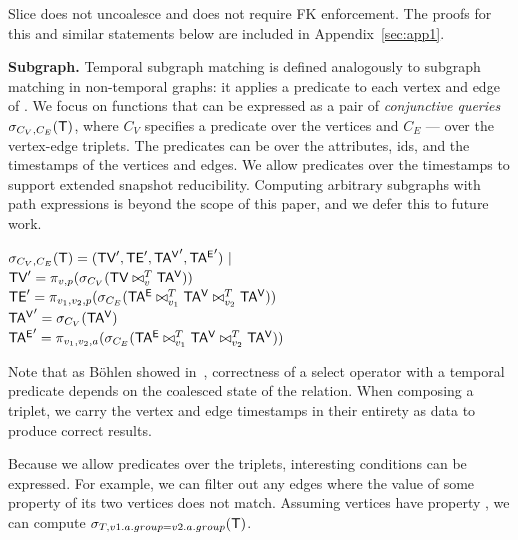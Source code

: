 Slice does not uncoalesce and does not require FK enforcement.  The
proofs for this and similar statements below are included in
Appendix~\ref{sec:app1}.


{\bf Subgraph.}  Temporal subgraph matching is defined analogously to
subgraph matching in non-temporal graphs: it applies a predicate to
each vertex and edge of \tg.  We focus on functions that can be
expressed as a pair of {\em conjunctive queries} $\sigma_{C_V,C_E}
(\mathsf{T})$, where $C_V$ specifies a predicate over the vertices and $C_E$
--- over the vertex-edge triplets.  The predicates can be over the
attributes, ids, and the timestamps of the vertices and edges.  We
allow predicates over the timestamps to support extended snapshot
reducibility.  Computing arbitrary subgraphs with path expressions is
beyond the scope of this paper, and we defer this to future work.

$\sigma_{C_V,C_E} (\mathsf{T}) = (\textsf{TV}',\textsf{TE}',\mathsf{TA^{V}}',\mathsf{TA^{E}}') ~|~$ \\
$\textsf{TV}' = \pi_{v,p} (\sigma_{C_V} ( \textsf{TV} \bowtie^T_v \mathsf{TA^{V}}))$ \\
$\textsf{TE}' = \pi_{v_1,v_2,p} (\sigma_{C_E} ( \mathsf{TA^{E}} \bowtie^T_{v_1} \mathsf{TA^{V}} \bowtie^T_{v_2} \mathsf{TA^{V}}))$ \\
$\mathsf{TA^{V}}' = \sigma_{C_V} (\mathsf{TA^{V}})$ \\
$\mathsf{TA^{E}}' = \pi_{v_1,v_2,a} (\sigma_{C_E} (\mathsf{TA^{E}} \bowtie^T_{v_1} \mathsf{TA^{V}} \bowtie^T_{v_2} \mathsf{TA^{V}}))$

Note that as B{\"{o}}hlen showed in~\cite{DBLP:reference/db/Bohlen09},
correctness of a select operator with a temporal predicate depends on
the coalesced state of the relation.  When composing a triplet, we
carry the vertex and edge timestamps in their entirety as data to
produce correct results.

Because we allow predicates over the triplets, interesting conditions
can be expressed.  For example, we can filter out any edges where the
value of some property of its two vertices does not match.  Assuming
vertices have property , we can compute
$\sigma_{T,v1.a.group=v2.a.group}(\mathsf{T})$.

